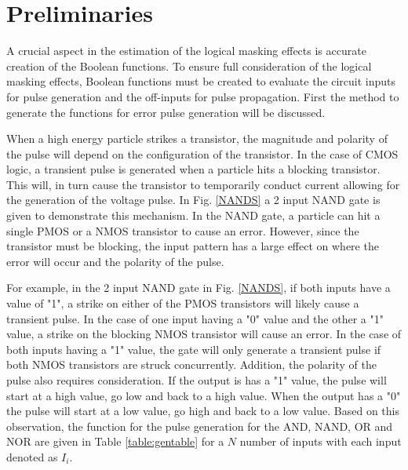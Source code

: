\section{Preliminaries} 

A crucial aspect in the estimation of the logical masking effects is accurate creation of the Boolean functions. To ensure full consideration of the logical masking effects, Boolean functions must be created to evaluate the circuit inputs for pulse generation and the off-inputs for pulse propagation. First the method to generate the functions for error pulse generation will be discussed. 

When a high energy particle strikes a transistor, the magnitude and polarity of the pulse will depend on the configuration of the transistor. In the case of CMOS logic, a transient pulse is generated when a particle hits a blocking transistor. This will, in turn cause the transistor to temporarily conduct current allowing for the generation of the voltage pulse. In Fig. \ref{NANDS} a 2 input NAND gate is given to demonstrate this mechanism. In the NAND gate, a particle can hit a single PMOS or a NMOS transistor to cause an error. However, since the transistor must be blocking, the input pattern has a large effect on where the error will occur and the polarity of the pulse. 

For example, in the 2 input NAND gate in Fig. \ref{NANDS}, if both inputs have a value of "1", a strike on either of the PMOS transistors will likely cause a transient pulse. In the case of one input having a "0" value and the other a "1" value,  a strike on the blocking NMOS transistor will cause an error. In the case of both inputs having a "1" value, the gate will only generate a transient pulse if both NMOS transistors are struck concurrently. Addition, the polarity of the pulse also requires consideration. If the output is has a "1" value, the pulse will start at a high value, go low and back to a high value. When the output has a "0" the pulse will start at a low value, go high and back to a low value. Based on this observation, the function for the pulse generation for the AND, NAND, OR and NOR are given in Table \ref{table:gentable} for a $N$ number of inputs with each input denoted as $I_i$.

